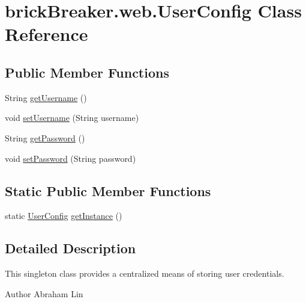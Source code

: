 \hypertarget{classbrick_breaker_1_1web_1_1_user_config}{
\section{brickBreaker.web.UserConfig Class Reference}
\label{classbrick_breaker_1_1web_1_1_user_config}
}
\subsection*{Public Member Functions}
\begin{DoxyCompactItemize}
\item 
String \hyperlink{classbrick_breaker_1_1web_1_1_user_config_a058016814e1d4b5b15c1708ed96e5acf}{getUsername} ()
\item 
void \hyperlink{classbrick_breaker_1_1web_1_1_user_config_a4565256db7d0f30cb7f4b63bd06a7472}{setUsername} (String username)
\item 
String \hyperlink{classbrick_breaker_1_1web_1_1_user_config_a06f536ee2fc04b8d49d42d0e110ff1dc}{getPassword} ()
\item 
void \hyperlink{classbrick_breaker_1_1web_1_1_user_config_a4b7cbc1a5c2e83db4e21ecc870b272c7}{setPassword} (String password)
\end{DoxyCompactItemize}
\subsection*{Static Public Member Functions}
\begin{DoxyCompactItemize}
\item 
static \hyperlink{classbrick_breaker_1_1web_1_1_user_config}{UserConfig} \hyperlink{classbrick_breaker_1_1web_1_1_user_config_a1d3a26745df81ea9335d7c1945400445}{getInstance} ()
\end{DoxyCompactItemize}


\subsection{Detailed Description}
This singleton class provides a centralized means of storing user credentials.

\begin{DoxyAuthor}{Author}
Abraham Lin 
\end{DoxyAuthor}


